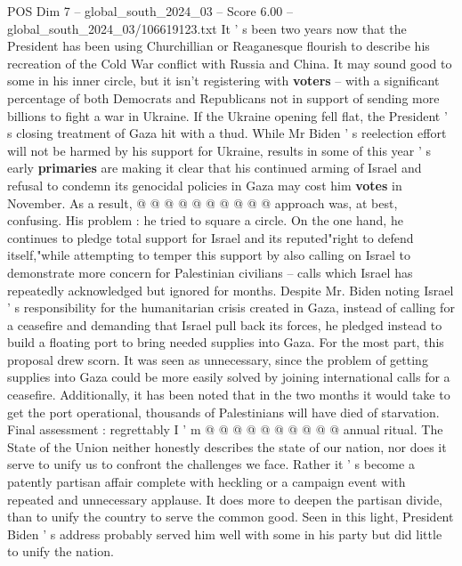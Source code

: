 \begin{textsample}{POS Dim 7 – global\_south\_2024\_03 – Score 6.00 – global\_south\_2024\_03/106619123.txt}
It ' s been two years now that the President has been using Churchillian or Reaganesque flourish to describe his recreation of the Cold War conflict with Russia and China.
It may sound good to some in his inner circle, but it isn't registering with \textbf{voters} -- with a significant percentage of both Democrats and Republicans not in support of sending more billions to fight a war in Ukraine.
If the Ukraine opening fell flat, the President ' s closing treatment of Gaza hit with a thud.
While Mr Biden ' s reelection effort will not be harmed by his support for Ukraine, results in some of this year ' s early \textbf{primaries} are making it clear that his continued arming of Israel and refusal to condemn its genocidal policies in Gaza may cost him \textbf{votes} in November.
As a result, @ @ @ @ @ @ @ @ @ @ approach was, at best, confusing.
His problem : he tried to square a circle.
On the one hand, he continues to pledge total support for Israel and its reputed"right to defend itself,"while attempting to temper this support by also calling on Israel to demonstrate more concern for Palestinian civilians -- calls which Israel has repeatedly acknowledged but ignored for months.
Despite Mr.
Biden noting Israel ' s responsibility for the humanitarian crisis created in Gaza, instead of calling for a ceasefire and demanding that Israel pull back its forces, he pledged instead to build a floating port to bring needed supplies into Gaza.
For the most part, this proposal drew scorn.
It was seen as unnecessary, since the problem of getting supplies into Gaza could be more easily solved by joining international calls for a ceasefire.
Additionally, it has been noted that in the two months it would take to get the port operational, thousands of Palestinians will have died of starvation.
Final assessment : regrettably I ' m @ @ @ @ @ @ @ @ @ @ annual ritual.
The State of the Union neither honestly describes the state of our nation, nor does it serve to unify us to confront the challenges we face.
Rather it ' s become a patently partisan affair complete with heckling or a campaign event with repeated and unnecessary applause.
It does more to deepen the partisan divide, than to unify the country to serve the common good.
Seen in this light, President Biden ' s address probably served him well with some in his party but did little to unify the nation.

\end{textsample}
